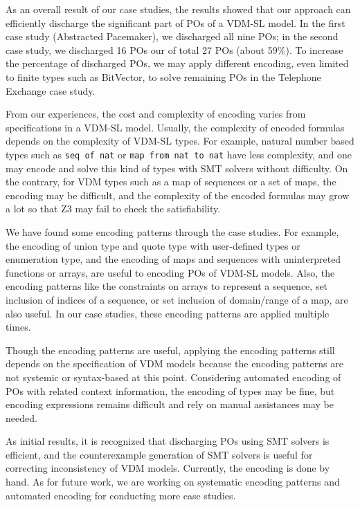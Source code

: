 As an overall result of our case studies, the results showed that our approach can efficiently discharge the significant part of POs of a VDM-SL model. In the first case study (Abstracted Pacemaker), we discharged all nine POs; in the second case study, we discharged 16 POs our of total 27 POs (about 59\%). To increase the percentage of discharged POs, we may apply different encoding, even limited to finite types such as BitVector, to solve remaining POs in the Telephone Exchange case study.

From our experiences, the cost and complexity of encoding varies from specifications in a VDM-SL model. Usually, the complexity of encoded formulas depends on the complexity of VDM-SL types. For example, natural number based types such as {\tt seq of nat} or {\tt map from nat to nat} have less complexity, and one may encode and solve this kind of types with SMT solvers without difficulty. On the contrary, for VDM types such as a map of sequences or a set of maps, the encoding may be difficult, and the complexity of the encoded formulas may grow a lot so that Z3 may fail to check the satisfiability.

We have found some encoding patterns through the case studies. For example, the encoding of union type and quote type with user-defined types or enumeration type, and the encoding of maps and sequences with uninterpreted functions or arrays, are useful to encoding POs of VDM-SL models. Also, the encoding patterns like the constraints on arrays to represent a sequence, set inclusion of indices of a sequence, or set inclusion of domain/range of a map, are also useful. In our case studies, these encoding patterns are applied multiple times. 

Though the encoding patterns are useful, applying the encoding patterns still depends on the specification of VDM models because the encoding patterns are not systemic or syntax-based at this point. Considering automated encoding of POs with related context information, the encoding of types may be fine, but encoding expressions remains difficult and rely on manual assistances may be needed.

As initial results, it is recognized that discharging POs using SMT solvers is efficient, and the counterexample generation of SMT solvers is useful for correcting inconsistency of VDM models. Currently, the encoding is done by hand. As for future work, we are working on systematic encoding patterns and automated encoding for conducting more case studies.